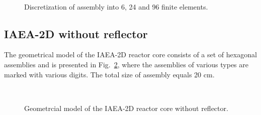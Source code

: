 \documentclass[authoryear]{elsarticle}
\begin{document}
\begin{figure}[h]
\begin{minipage}{0.30\linewidth}
	\end{minipage}
	\hfill
	\begin{minipage}{0.30\linewidth}
		\\
	\end{minipage}
	\caption{Discretization of assembly into 6, 24 and 96 finite elements.}
	\label{fig:mesh}
\end{figure}

\subsection{IAEA-2D without reflector}
The geometrical model of the IAEA-2D reactor core \citep{chao1995} consists of a set of hexagonal assemblies and is presented in Fig.~\ref{fig:iaea}, where the assemblies of various types are marked with various digits. 
The total size of assembly equals 20 cm. 

\begin{figure}[h]
	\\
	\caption{Geometrcial model of the IAEA-2D reactor core without reflector.}
	\label{fig:iaea}
\end{figure}
\end{document}
